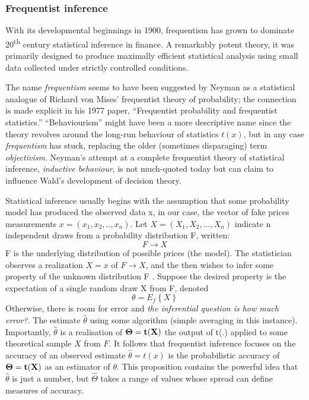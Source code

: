 \documentclass{article}
\begin{document}
\hypertarget{frequentist-inference}{%
\subsubsection{Frequentist inference}\label{frequentist-inference}}

With its developmental beginnings in 1900, frequentism has grown to
dominate 20\textsuperscript{th} century statistical inference in
finance. A remarkably potent theory, it was primarily designed to
produce maximally efficient statistical analysis using small data
collected under strictly controlled conditions.

The name \emph{frequentism} seems to have been suggested by Neyman as a
statistical analogue of Richard von Mises' frequentist theory of
probability; the connection is made explicit in his 1977 paper,
``Frequentist probability and frequentist statistics.'' ``Behaviourism''
might have been a more descriptive name since the theory revolves around
the long-run behaviour of statistics \(t(x)\), but in any case
\emph{frequentism} has stuck, replacing the older (sometimes
disparaging) term \emph{objectivism}. Neyman's attempt at a complete
frequentist theory of statistical inference, \emph{inductive behaviour},
is not much-quoted today but can claim to influence Wald's development
of decision theory.

Statistical inference usually begins with the assumption that some
probability model has produced the observed data x, in our case, the
vector of fake prices measurements \(x=(x_1,x_2,..,x_n)\). Let
\(X=(X_1,X_2,...,X_n)\) indicate n independent draws from a probability
distribution F, written: \[F \to X\] F is the underlying distribution of
possible prices (the model). The statistician observes a realization
\(X= x\) of \(F \to X\), and the then wishes to infer some property of
the unknown distribution F . Suppose the desired property is the
expectation of a single random draw X from F, denoted
\[\theta=E_f\left\{ X \right\}\] Otherwise, there is room for error and
\emph{the inferential question is how much error?}. The estimate
\(\hat{\theta}\) using some algorithm (simple averaging in this
instance). Importantly, \(\hat{\theta}\) is a realisation of
\(\bf{\Theta}=t(X)\) the output of t(.) applied to some theoretical
sample \(X\) from \(F\). It follows that frequentist inference focuses
on the accuracy of an observed estimate \(\hat{\theta}=t(x)\) is the
probabilistic accuracy of \(\bf{\Theta}=t(X)\) as an estimator of
\(\theta\). This proposition contains the powerful idea that
\(\hat{\theta}\) is just a number, but \(\hat{\Theta}\) takes a range of
values whose spread can define measures of accuracy.
\end{document}
